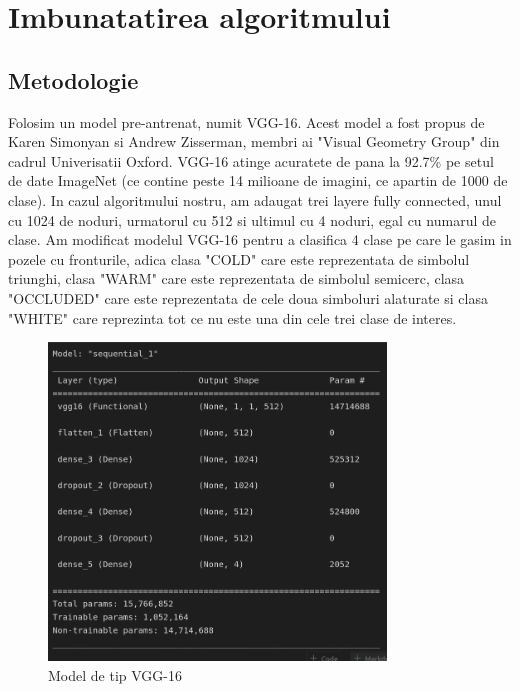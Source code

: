 \documentclass{article}
\begin{document}
\clearpage
\section{Imbunatatirea algoritmului}

\subsection{Metodologie}
  Folosim un model pre-antrenat, numit VGG-16. Acest model a fost propus de Karen Simonyan si Andrew Zisserman, membri ai "Visual Geometry Group" din cadrul Univerisatii Oxford. 
  VGG-16 atinge acuratete de pana la 92.7\% pe setul de date ImageNet (ce contine peste 14 milioane de imagini, ce apartin de 1000 de clase).
  \newline
  In cazul algoritmului nostru, am adaugat trei layere fully connected, unul cu 1024 de noduri, urmatorul cu 512 si ultimul cu 4 noduri, egal cu numarul de clase.
  Am modificat modelul VGG-16 pentru a clasifica 4 clase pe care le gasim in pozele cu fronturile, adica clasa "COLD" care este reprezentata de simbolul triunghi, clasa "WARM" care este reprezentata de simbolul semicerc, clasa "OCCLUDED" care este reprezentata de cele doua simboluri alaturate si clasa "WHITE" care reprezinta tot ce nu este una din cele trei clase de interes. 
  \bigskip
  
  \begin{figure}[!htb]
  \centering
  \includegraphics[width=0.8\textwidth]{result5.jpg}
  \caption{\label{fig:6}Model de tip VGG-16}
  \end{figure}
\end{document}
